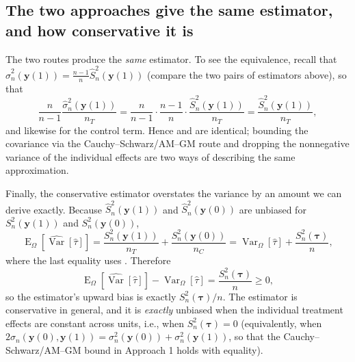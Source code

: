\documentclass[12pt,leqno]{article}
\theoremstyle{newstyle}
\DeclareMathOperator{\E}{\mathrm{E}}
\DeclareMathOperator{\Var}{\mathrm{Var}}
\newcommand{\EZ}{\E_{\Omega}}    \newcommand{\VarZ}{\Var_{\Omega}}  %
\newcommand{\pov}[1]{\bm{y}(#1)}    %
\newcommand{\tauhat}{\hat{\tau}}
\newcommand{\Ssq}[2][n]{S_{#1}^{2}(#2)}
\newcommand{\ssq}[2][n]{\sigma_{#1}^{2}(#2)}
\newcommand{\scov}[2][n]{\sigma_{#1}(#2)}
\newcommand{\Ssqhat}[2][n]{\widehat{S}_{#1}^{2}(#2)}
\newcommand{\ssqhat}[2][n]{\widehat{\sigma}_{#1}^{2}(#2)}
\newcommand{\Varhat}{\widehat{\Var}}
\begin{document}
\subsection{The two approaches give the same estimator, and how conservative it is}

The two routes produce the \textit{same} estimator. To see the equivalence, recall that $\ssqhat{\pov{1}} = \frac{n - 1}{n}\Ssqhat{\pov{1}}$ (compare the two pairs of estimators above), so that
\begin{equation*}
\dfrac{n}{n - 1}\dfrac{\ssqhat{\pov{1}}}{n_T} = \dfrac{n}{n - 1}\cdot\dfrac{n - 1}{n}\cdot\dfrac{\Ssqhat{\pov{1}}}{n_T} = \dfrac{\Ssqhat{\pov{1}}}{n_T},
\end{equation*}
and likewise for the control term. Hence  and  are identical; bounding the covariance via the Cauchy--Schwarz/AM--GM route and dropping the nonnegative variance of the individual effects are two ways of describing the same approximation.

Finally, the conservative estimator overstates the variance by an amount we can derive exactly. Because $\Ssqhat{\pov{1}}$ and $\Ssqhat{\pov{0}}$ are unbiased for $\Ssq{\pov{1}}$ and $\Ssq{\pov{0}}$,
\begin{equation*}
\EZ\left[\Varhat\left[\tauhat\right]\right] = \dfrac{\Ssq{\pov{1}}}{n_T} + \dfrac{\Ssq{\pov{0}}}{n_C} = \VarZ\left[\tauhat\right] + \dfrac{\Ssq{\bm{\tau}}}{n},
\end{equation*}
where the last equality uses . Therefore
\begin{equation*}
\EZ\left[\Varhat\left[\tauhat\right]\right] - \VarZ\left[\tauhat\right] = \dfrac{\Ssq{\bm{\tau}}}{n} \geq 0,
\end{equation*}
so the estimator's upward bias is exactly $\Ssq{\bm{\tau}}/n$. The estimator is conservative in general, and it is \textit{exactly} unbiased when the individual treatment effects are constant across units, i.e., when $\Ssq{\bm{\tau}} = 0$ (equivalently, when $2\scov{\pov{0}, \pov{1}} = \ssq{\pov{0}} + \ssq{\pov{1}}$, so that the Cauchy--Schwarz/AM--GM bound in Approach 1 holds with equality).

\begin{singlespace}


\end{singlespace}
\end{document}
